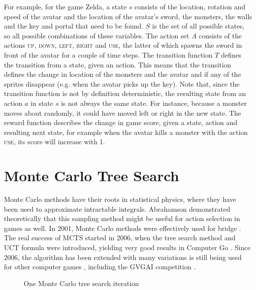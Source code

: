 For example, for the game Zelda, a state $s$ consists of the location, rotation
and speed of the avatar and the location of the avatar's sword, the monsters, the
walls and the key and portal that need to be found. $S$ is the set of all
possible states, so all possible combinations of these variables. The action set
$A$ consists of the actions \textsc{up}, \textsc{down}, \textsc{left},
\textsc{right} and \textsc{use}, the latter of which spawns the sword in front
of the avatar for a couple of time steps. The transition function $T$ defines the
transition from a state, given an action.  This means that the transition
defines the change in location of the monsters and the avatar and if any of the
sprites disappear (e.g. when the avatar picks up the key). Note that, since
the transition function is not by definition deterministic, the resulting state
from an action $a$ in state $s$ is not always the same state. For instance,
because a monster moves about randomly, it could have moved left or right in the
new state. The reward function describes the change in game score, given a
state, action and resulting next state, for example when the avatar kills a
monster with the action \textsc{use}, its score will increase with 1.

\section{Monte Carlo Tree Search}
\label{subsec:mcts}
Monte Carlo methods have their roots in statistical physics, where they have
been used to approximate intractable integrals. Abrahamson
\cite{abramson1990expected} demonstrated theoretically that this sampling method
might be useful for action selection in games as well.  In 2001, Monte Carlo
methods were effectively used for bridge \cite{ginsberg2001gib}. The real
success of MCTS started in 2006, when the tree search method and UCT formula
were introduced, yielding very good results in Computer Go
\cite{gelly2006modification}. Since 2006, the algorithm has been extended with
many variations is still being used for other computer games
\cite{browne2012survey}, including the GVGAI competition
\cite{perez2014knowledge}.

\begin{figure}
	\centering
	\caption{One Monte Carlo tree search iteration}
	\label{fig:mcts}
\end{figure}

